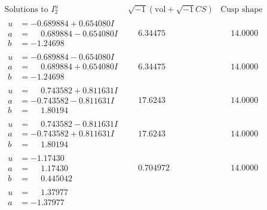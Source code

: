 \documentclass[1p]{elsarticle_modified}
\theoremstyle{definition}
\newcommand{\I}{\sqrt{-1}}
\begin{document}
$$\begin{array}{c|c|c}  
\text{Solutions to }I^u_{2}& \I (\text{vol} + \sqrt{-1}CS) & \text{Cusp shape}\\
 \hline 
\begin{aligned}
u &= -0.689884 + 0.654080 I \\
a &= \phantom{-}0.689884 - 0.654080 I \\
b &= -1.24698\phantom{ +0.000000I}\end{aligned}
 & \phantom{-}6.34475\phantom{ +0.000000I} & \phantom{-}14.0000\phantom{ +0.000000I} \\ \hline\begin{aligned}
u &= -0.689884 - 0.654080 I \\
a &= \phantom{-}0.689884 + 0.654080 I \\
b &= -1.24698\phantom{ +0.000000I}\end{aligned}
 & \phantom{-}6.34475\phantom{ +0.000000I} & \phantom{-}14.0000\phantom{ +0.000000I} \\ \hline\begin{aligned}
u &= \phantom{-}0.743582 + 0.811631 I \\
a &= -0.743582 - 0.811631 I \\
b &= \phantom{-}1.80194\phantom{ +0.000000I}\end{aligned}
 & \phantom{-}17.6243\phantom{ +0.000000I} & \phantom{-}14.0000\phantom{ +0.000000I} \\ \hline\begin{aligned}
u &= \phantom{-}0.743582 - 0.811631 I \\
a &= -0.743582 + 0.811631 I \\
b &= \phantom{-}1.80194\phantom{ +0.000000I}\end{aligned}
 & \phantom{-}17.6243\phantom{ +0.000000I} & \phantom{-}14.0000\phantom{ +0.000000I} \\ \hline\begin{aligned}
u &= -1.17430\phantom{ +0.000000I} \\
a &= \phantom{-}1.17430\phantom{ +0.000000I} \\
b &= \phantom{-}0.445042\phantom{ +0.000000I}\end{aligned}
 & \phantom{-}0.704972\phantom{ +0.000000I} & \phantom{-}14.0000\phantom{ +0.000000I} \\ \hline\begin{aligned}
u &= \phantom{-}1.37977\phantom{ +0.000000I} \\
a &= -1.37977\phantom{ +0.000000I} \\

\end{aligned}
\end{array}$$
\end{document}
